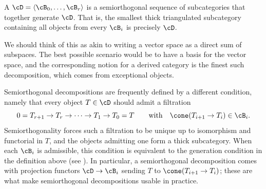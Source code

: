 \documentclass{amsart}
\begin{document}
\begin{defn}
  A  $\cD = \langle \cB_0,\dots,\cB_r\rangle$ is a semiorthogonal sequence of subcategories that together generate $\cD$. That is, the smallest thick triangulated subcategory containing all objects from every $\cB_i$ is precisely $\cD$.
\end{defn}

We should think of this as akin to writing a vector space as a direct sum of subspaces.  The best possible scenario would be to have a basis for the vector space, and the corresponding notion for a derived category is the finest such decomposition, which comes from exceptional objects.

\begin{remark}\label{rem:SODfiltration}
  Semiorthogonal decompositions are frequently defined by a different condition, namely that every object $T\in\cD$ should admit a filtration
  \[ 0 = T_{r+1}\to T_r\to\cdots\to T_1\to T_0 = T \qquad\text{with}\quad \cone(T_{i+1}\to T_i)\in\cB_i. \]
  Semiorthogonality forces such a filtration to be unique up to isomorphism and functorial in $T$, and the objects admitting one form a thick subcategory.  When each $\cB_i$ is admissible, this condition is equivalent to the generation condition in the definition above (see \cite[\S2]{Kuznetsov14}). In particular, a semiorthogonal decomposition comes with projection functors $\cD\to\cB_i$ sending $T$ to $\cone(T_{i+1}\to T_i)$; these are what make semiorthogonal decompositions usable in practice.
\end{remark}
\end{document}

